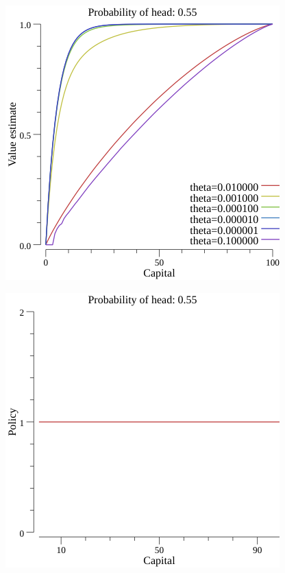 \documentclass[12pt,a4paper]{article}
\begin{document}
\begin{enumerate}
\begin{center}
      \includegraphics[scale=0.6]{gambling_value_0.55}

      \includegraphics[scale=0.6]{gambling_policy_0.55}
    \end{center}

\end{enumerate}
\end{document}
